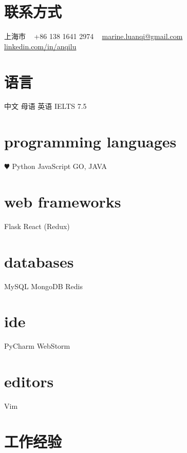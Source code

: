 \documentclass[]{friggeri-cv-cn} %
\begin{document}


\begin{aside} %
\section{联系方式}
上海市
~
+86 138 1641 2974
~
\href{mailto:marine.luanqi@gmail.com}{marine.luanqi@gmail.com}
~
\href{https://www.linkedin.com/in/anqilu}{linkedin.com/in/anqilu}
\section{语言}
中文 母语
英语 IELTS 7.5
\section{programming languages}
{\color{red} $\varheartsuit$} Python
JavaScript
GO, JAVA
\section{web frameworks}
Flask
React (Redux)
\section{databases}
MySQL
MongoDB
Redis
\section{ide}
PyCharm
WebStorm
\section{editors}
Vim
\end{aside}


\section{工作经验}
\end{document}
